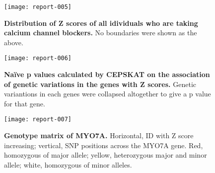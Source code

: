 \documentclass{article}
\begin{document}
\begin{figure}[htb]
\centering
\texttt{[image: report-005]}

\caption{{\bf {Distribution of Z scores of all idividuals who are taking calcium channel blockers.}} No boundaries were shown as the above.}
\label{fig:ccbzdistr}
\end{figure}


\begin{figure}[htb]
\centering
\texttt{[image: report-006]}

\caption{{\bf {Na\"ive p values calculated by CEPSKAT on the association of genetic variations in the genes with Z scores.}} Genetic variantions in each genes were collapsed altogether to give a p value for that gene. }
\label{fig:allP}
\end{figure}

\begin{figure}[htb]
\centering
\texttt{[image: report-007]}

\caption{{\bf {Genotype matrix of MYO7A.}} Horizontal, ID with Z score increasing; vertical, SNP positions across the MYO7A gene. Red, homozygous of major allele; yellow, heterozygous major and minor allele; white, homozygous of minor alleles.}
\label{fig:myo7a}
\end{figure}
\end{document}
